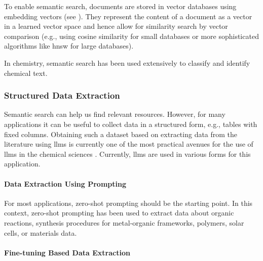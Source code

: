 To enable semantic search, documents are stored in vector databases using embedding vectors (see ).\autocite{bojanowski2017enriching} 
They represent the content of a document as a vector in a learned vector space and hence allow for similarity search by vector comparison (e.g., using cosine similarity for small databases or more sophisticated algorithms like \gls{hnsw} for large databases\autocite{malkov2018efficient}). 

In chemistry, semantic search has been used extensively to classify and identify chemical text.\autocite{Guo2021,beltagy2019scibert0,trewartha2022quantifying}

\subsubsection{Structured Data Extraction}

Semantic search can help us find relevant resources. 
However, for many applications it can be useful to collect data in a structured form, e.g., tables with fixed columns.
Obtaining such a dataset based on extracting data from the literature using \glspl{llm} is currently one of the most practical avenues for the use of \glspl{llm} in the chemical sciences \autocite{schilling2025text}.
Currently, \glspl{llm} are used in various forms for this application. 

\paragraph{Data Extraction Using Prompting} 

For most applications, zero-shot prompting should be the starting point. In this context, zero-shot prompting has been used to extract data about organic reactions\autocite{rios2025llm,vangala2024suitability, Patiny2023automatic}, synthesis procedures for metal-organic frameworks\autocite{zheng2023chatgpt}, polymers\autocite{schilling2024using,gupta2024data}, solar cells\autocite{shabih2025automated}, or materials data\autocite{polak2024extracting,hira2024reconstructing,kumar2025mechbert,wu2025large,huang2022batterybert}. 
 
\paragraph{Fine-tuning Based Data Extraction} 

